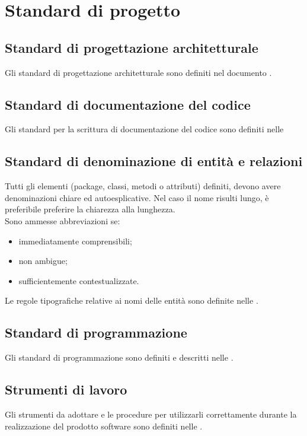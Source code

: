 \section{Standard di progetto}{
	\subsection{Standard di progettazione architetturale}{
		Gli standard di progettazione architetturale sono definiti nel documento \href{run:../../Esterni/\fSpecificaTecnica}{\fEscapeSpecificaTecnica}.}
	\subsection{Standard di documentazione del codice}{
		Gli standard per la scrittura di documentazione del codice sono definiti nelle \href{run:../../Interni/\fNormeDiProgetto}{\fEscapeNormeDiProgetto}}
	\subsection{Standard di denominazione di entità e relazioni}{
		Tutti gli elementi (package, classi, metodi o attributi) definiti, devono avere denominazioni chiare ed autoesplicative. Nel caso il nome risulti lungo, è preferibile preferire la chiarezza alla lunghezza. \\
		Sono ammesse abbreviazioni se:
		\begin{itemize}
			\item immediatamente comprensibili;
			\item non ambigue;
			\item sufficientemente contestualizzate.
		\end{itemize}
		Le regole tipografiche relative ai nomi delle entità sono definite nelle \href{run:../../Interni/\fNormeDiProgetto}{\fEscapeNormeDiProgetto}.}
	\subsection{Standard di programmazione}{
		Gli standard di programmazione sono definiti e descritti nelle \href{run:../../Interni/\fNormeDiProgetto}{\fEscapeNormeDiProgetto}.}
	\subsection{Strumenti di lavoro}{
		Gli strumenti da adottare e le procedure per utilizzarli correttamente durante la realizzazione del prodotto software sono definiti nelle \href{run:../../Interni/\fNormeDiProgetto}{\fEscapeNormeDiProgetto}.}
}